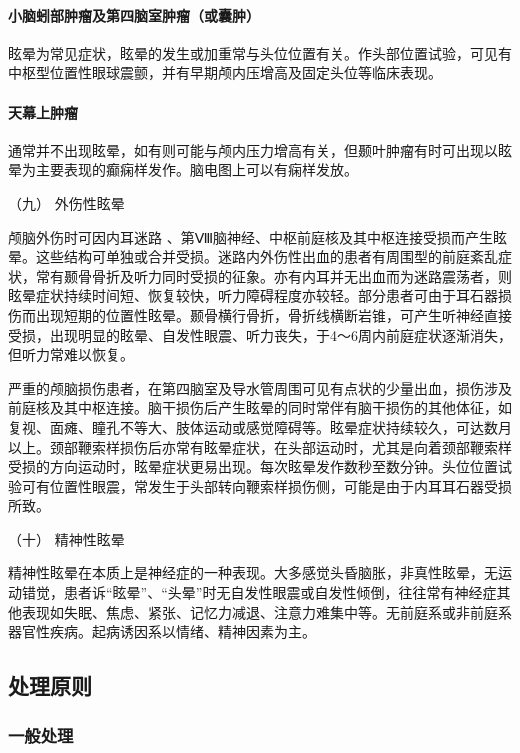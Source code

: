 \paragraph{小脑蚓部肿瘤及第四脑室肿瘤（或囊肿）}

眩晕为常见症状，眩晕的发生或加重常与头位位置有关。作头部位置试验，可见有中枢型位置性眼球震颤，并有早期颅内压增高及固定头位等临床表现。

\paragraph{天幕上肿瘤}

通常并不出现眩晕，如有则可能与颅内压力增高有关，但颞叶肿瘤有时可出现以眩晕为主要表现的癫痫样发作。脑电图上可以有痫样发放。

\hypertarget{text00012.htmlux5cux23CHP1-3-2-6-9}{}
（九） 外伤性眩晕

颅脑外伤时可因内耳迷路
、第Ⅷ脑神经、中枢前庭核及其中枢连接受损而产生眩晕。这些结构可单独或合并受损。迷路内外伤性出血的患者有周围型的前庭紊乱症状，常有颞骨骨折及听力同时受损的征象。亦有内耳并无出血而为迷路震荡者，则眩晕症状持续时间短、恢复较快，听力障碍程度亦较轻。部分患者可由于耳石器损伤而出现短期的位置性眩晕。颞骨横行骨折，骨折线横断岩锥，可产生听神经直接受损，出现明显的眩晕、自发性眼震、听力丧失，于4～6周内前庭症状逐渐消失，但听力常难以恢复。

严重的颅脑损伤患者，在第四脑室及导水管周围可见有点状的少量出血，损伤涉及前庭核及其中枢连接。脑干损伤后产生眩晕的同时常伴有脑干损伤的其他体征，如复视、面瘫、瞳孔不等大、肢体运动或感觉障碍等。眩晕症状持续较久，可达数月以上。颈部鞭索样损伤后亦常有眩晕症状，在头部运动时，尤其是向着颈部鞭索样受损的方向运动时，眩晕症状更易出现。每次眩晕发作数秒至数分钟。头位位置试验可有位置性眼震，常发生于头部转向鞭索样损伤侧，可能是由于内耳耳石器受损所致。

\hypertarget{text00012.htmlux5cux23CHP1-3-2-6-10}{}
（十） 精神性眩晕

精神性眩晕在本质上是神经症的一种表现。大多感觉头昏脑胀，非真性眩晕，无运动错觉，患者诉“眩晕”、“头晕”时无自发性眼震或自发性倾倒，往往常有神经症其他表现如失眠、焦虑、紧张、记忆力减退、注意力难集中等。无前庭系或非前庭系器官性疾病。起病诱因系以情绪、精神因素为主。

\subsection{处理原则}

\subsubsection{一般处理}

